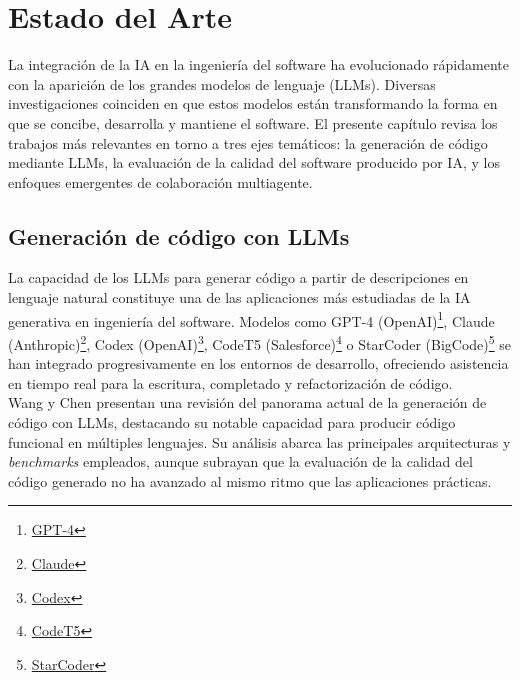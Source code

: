 
\cleardoublepage
\chapter{Estado del Arte} \label{chap:RelatedWork}
La integración de la \ac{IA} en la ingeniería del software ha evolucionado rápidamente con la aparición de los grandes modelos de lenguaje (LLMs). Diversas investigaciones  \cite{Khade:2025:AIinSD, Qian:2024:ChatDev} 
coinciden en que estos modelos están transformando la forma en que se concibe, desarrolla y mantiene el software. El presente capítulo revisa los trabajos más relevantes en torno a tres ejes temáticos: la generación de código mediante \ac{LLMs}, la evaluación de la calidad del software producido por \ac{IA}, y los enfoques emergentes de colaboración multiagente.

\section{Generación de código con LLMs} \label{sec:generacion-codigo}

La capacidad de los \ac{LLMs} para generar código a partir de descripciones en lenguaje natural constituye una de las aplicaciones más estudiadas de la \ac{IA} generativa en ingeniería del software. Modelos como GPT-4 (OpenAI)\footnote{\href{https://openai.com/index/gpt-4}{GPT-4}}, Claude (Anthropic)\footnote{\href{https://claude.com/product/overview}{Claude}}, Codex (OpenAI)\footnote{\href{https://openai.com/codex}{Codex}}, CodeT5 (Salesforce)\footnote{\href{https://github.com/salesforce/codet5}{CodeT5}} o StarCoder (BigCode)\footnote{\href{https://huggingface.co/blog/starcoder}{StarCoder}} se han integrado progresivamente en los entornos de desarrollo, ofreciendo asistencia en tiempo real para la escritura, completado y refactorización de código.\\

Wang y Chen \cite{Wang:2023:LLMReview} presentan una revisión del panorama actual de la generación de código con \ac{LLMs}, destacando su notable capacidad para producir código funcional en múltiples lenguajes. Su análisis abarca las principales arquitecturas y \textit{benchmarks} empleados, aunque subrayan que la evaluación de la calidad del código generado no ha avanzado al mismo ritmo que las aplicaciones prácticas.\\


